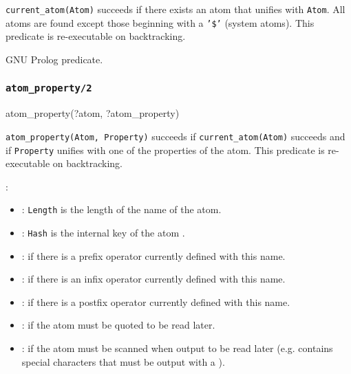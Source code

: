 \texttt{current\_atom(Atom)} succeeds if there exists an atom that unifies
with \texttt{Atom}. All atoms are found except those beginning with a
\texttt{'\$'} (system atoms). This predicate is re-executable on
backtracking.

\begin{PlErrors}


\end{PlErrors}

\Portability

GNU Prolog predicate.

\subsubsection{\texttt{atom\_property/2}}
\label{atom-property/2}

\begin{TemplatesOneCol}
atom\_property(?atom, ?atom\_property)

\end{TemplatesOneCol}

\Description

\texttt{atom\_property(Atom, Property)} succeeds if
\texttt{current\_atom(Atom)} succeeds  and if
\texttt{Property} unifies with one of the properties of the atom. This
predicate is re-executable on backtracking.

:

\begin{itemize}

\item {}: \texttt{Length} is the length of the
name of the atom.

\item {}: \texttt{Hash} is the internal key of the
atom .

\item {}: if there is a prefix operator currently defined
with this name.

\item {}: if there is an infix operator currently defined
with this name.

\item {}: if there is a postfix operator currently defined
with this name.

\item {}: if the atom must be quoted to be read later.

\item {}: if the atom must be scanned when output to be
read later (e.g. contains special characters that must be output with a
\texttt{{\bs}} ).

\end{itemize}

